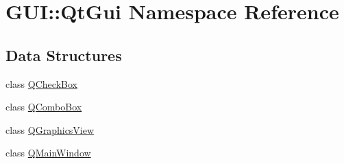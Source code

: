 \hypertarget{namespaceGUI_1_1QtGui}{}\section{G\+U\+I\+:\+:Qt\+Gui Namespace Reference}
\label{namespaceGUI_1_1QtGui}
\subsection*{Data Structures}
\begin{DoxyCompactItemize}
\item 
class \hyperlink{classGUI_1_1QtGui_1_1QCheckBox}{Q\+Check\+Box}
\item 
class \hyperlink{classGUI_1_1QtGui_1_1QComboBox}{Q\+Combo\+Box}
\item 
class \hyperlink{classGUI_1_1QtGui_1_1QGraphicsView}{Q\+Graphics\+View}
\item 
class \hyperlink{classGUI_1_1QtGui_1_1QMainWindow}{Q\+Main\+Window}
\end{DoxyCompactItemize}
